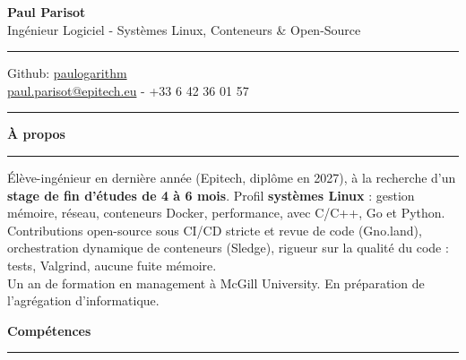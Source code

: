 \documentclass[9pt]{extarticle}
\begin{document}
\begin{center}
	{\huge\bfseries Paul Parisot}
	\\[4pt]
	{\Large Ingénieur Logiciel - Systèmes Linux, Conteneurs \& Open-Source}
	\\
\end{center}

\par\vspace{-5pt}
\rule{\linewidth}{0.4pt}
\par\vspace{-5pt}

\begin{center}
	Github: \href{https://github.com/paulogarithm}{paulogarithm}
	\\
	\href{mailto:paul.parisot@epitech.eu}{paul.parisot@epitech.eu} - +33 6 42 36 01 57
	\\
\end{center}

\par\vspace{-10pt}
\rule{\linewidth}{0.4pt}
\par\vspace{7pt}

{\large\bfseries À propos}
\par\vspace{-8pt}
\rule{\linewidth}{0.4pt}
\par\vspace{5pt}

Élève-ingénieur en dernière année (Epitech, diplôme en 2027), à la recherche d'un {\bfseries stage de fin d'études de 4 à 6 mois}. Profil {\bfseries systèmes Linux} : gestion mémoire, réseau, conteneurs Docker, performance, avec C/C++, Go et Python.
\\
Contributions open-source sous CI/CD stricte et revue de code (Gno.land), orchestration dynamique de conteneurs (Sledge), rigueur sur la qualité du code : tests, Valgrind, aucune fuite mémoire.
\\
Un an de formation en management à McGill University. En préparation de l'agrégation d'informatique.
\par\vspace{5pt}

{\large\bfseries Compétences}
\par\vspace{-8pt}
\rule{\linewidth}{0.4pt}
\par\vspace{5pt}
\end{document}
